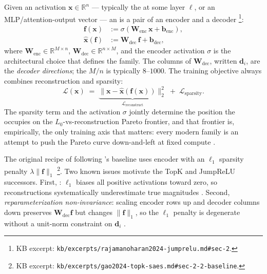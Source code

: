 Given an activation $\mathbf{x} \in \mathbb{R}^n$ — typically the
 at some layer $\ell$, or an MLP/attention-output vector
— an  is a pair of an encoder and a decoder
\citep[\S 2, Eq.~1--2]{rajamanoharan2024-jumprelu}\footnote{KB excerpt:
\texttt{kb/excerpts/rajamanoharan2024-jumprelu.md\#sec-2}.}:
\begin{align}
  \mathbf{f}(\mathbf{x}) &:= \sigma\!\left(\mathbf{W}_{\text{enc}}\,\mathbf{x} + \mathbf{b}_{\text{enc}}\right),
  \label{eq:sae-encoder}\\
  \hat{\mathbf{x}}(\mathbf{f}) &:= \mathbf{W}_{\text{dec}}\,\mathbf{f} + \mathbf{b}_{\text{dec}},
  \label{eq:sae-decoder}
\end{align}
where $\mathbf{W}_{\text{enc}} \in \mathbb{R}^{M \times n}$,
$\mathbf{W}_{\text{dec}} \in \mathbb{R}^{n \times M}$, and the encoder
activation $\sigma$ is the architectural choice that defines the 
family. The columns of $\mathbf{W}_{\text{dec}}$, written
$\mathbf{d}_i$, are the \emph{decoder  directions}; the
 $M / n$ is typically $8$--$1000$. The training
objective always combines reconstruction and sparsity:
\begin{equation}
  \mathcal{L}(\mathbf{x})
  \;=\;
  \underbrace{\|\mathbf{x} - \hat{\mathbf{x}}(\mathbf{f}(\mathbf{x}))\|_2^2}_{\mathcal{L}_{\text{reconstruct}}}
  \;+\;
  \mathcal{L}_{\text{sparsity}}.
  \label{eq:sae-loss}
\end{equation}
The sparsity term and the activation $\sigma$ jointly determine the
position the  occupies on the $L_0$-vs-reconstruction Pareto
frontier, and that frontier is, empirically, the only training axis
that matters: every modern  family is an attempt to push the
Pareto curve down-and-left at fixed compute
\citep[\S 1]{rajamanoharan2024-jumprelu}.

The original recipe of \citet{templeton2024-scaling-monosemanticity}
following \citet{gao2024-topk-saes}'s baseline uses  encoder with
an $\ell_1$ sparsity penalty $\lambda \|\mathbf{f}\|_1$
\citep[\S 2.2, Eq.~1]{gao2024-topk-saes}\footnote{KB excerpt:
\texttt{kb/excerpts/gao2024-topk-saes.md\#sec-2-2-baseline}.}. Two
known issues motivate the TopK and JumpReLU successors. First,
\emph{}: $\ell_1$ biases all positive activations toward zero,
so reconstructions systematically underestimate true 
magnitudes \citep[\S 2.3]{gao2024-topk-saes}. Second,
\emph{reparameterization non-invariance}: scaling encoder rows up and
decoder columns down preserves $\mathbf{W}_{\text{dec}}\mathbf{f}$ but
changes $\|\mathbf{f}\|_1$, so the $\ell_1$ penalty is degenerate
without a unit-norm constraint on $\mathbf{d}_i$
\citep[\S 3]{rajamanoharan2024-jumprelu}.


